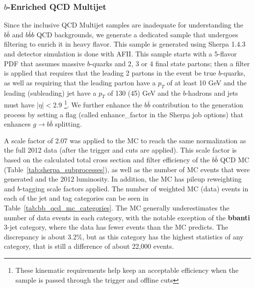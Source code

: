 \subsubsection{$b$-Enriched QCD Multijet}
\label{sec:bb_qcd_mc}
Since the inclusive QCD Multijet samples are inadequate for understanding the $b\bar{b}$ and 
$b\bar{b}b$ QCD backgrounds, we generate a dedicated sample that undergoes filtering to 
enrich it in heavy flavor.  This sample is generated using Sherpa 1.4.3 
\cite{Sherpa} and detector simulation is done with AFII.  This sample 
starts with a 5-flavor PDF that assumes massive $b$-quarks and 
2, 3 or 4 final state partons; then a filter is applied that 
requires that the leading 2 partons in the event be true $b$-quarks, 
as well as requiring that the leading parton have a $p_T$ 
of at least 10 GeV and the leading (subleading) jet have a $p_T$ of
130 (45) GeV and the $b$-hadrons and jets must have $|\eta|<$2.9 
\footnote{These kinematic requirements help keep an acceptable efficiency when 
the sample is passed through the trigger and offline cuts}.  We further enhance
the $b\bar{b}$ contribution to the generation process by setting a flag (called enhance\_factor
in the Sherpa job options) that enhances $g\rightarrow b\bar{b}$ splitting.

A scale factor of 2.07 was applied to the MC to  
reach the same normalization as the full 2012 data (after the trigger and cuts are 
applied).  This scale factor is based on the calculated total cross section and
filter efficiency of the $b\bar{b}$ QCD MC (Table~\ref{tab:sherpa_subprocesses}), as well
as the number of MC events that were generated and the 2012 luminosity. 
In addition, the MC has pileup reweighting and $b$-tagging scale factors
applied.  The number of weighted MC (data) events in each of the jet and tag
categories can be seen in Table~\ref{tab:bb_qcd_mc_categories}.  The MC
generally underestimates the number of data events in each category,
with the notable exception of the \textbf{bbanti} 3-jet category, where 
the data has fewer events than the MC predicts.  The discrepancy is about
3.2\%, but as this category has the highest statistics of any category,
that is still a difference of about 22,000 events.

